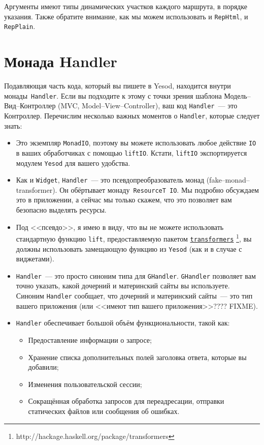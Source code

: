 Аргументы имеют типы динамических участков каждого маршрута, в порядке
указания. Также обратите внимание, как мы можем использовать и
\lstinline!RepHtml!, и \lstinline!RepPlain!.

\section{Монада Handler}
Подавляющая часть кода, который вы пишете в Yesod, находится внутри
монады~\lstinline!Handler!. Если вы подходите к этому с точки зрения
шаблона Модель--Вид--Контроллер (MVC, Model--View--Controller), ваш код
\lstinline!Handler!~--- это Контроллер. Перечислим несколько важных
моментов о \lstinline!Handler!, которые следует знать:
\begin{itemize}
\item Это экземпляр \lstinline!MonadIO!, поэтому вы можете
  использовать любое действие \lstinline!IO! в ваших обработчиках с
  помощью \lstinline!liftIO!. Кстати, \lstinline!liftIO! экспортируется
  модулем \lstinline!Yesod! для вашего удобства.
\item Как и \lstinline!Widget!, \lstinline!Handler!~--- это
  псевдопреобразователь монад (fake--monad--transformer). Он обёртывает
  монаду~\lstinline!ResourceT IO!. Мы подробно обсуждаем это в
  приложении, а
  сейчас мы только скажем, что это позволяет вам безопасно выделять
  ресурсы.
\item Под <<псевдо>>, я имею в виду, что вы не можете использовать
  стандартную функцию \lstinline!lift!, предоставляемую пакетом
  \href{http://hackage.haskell.org/package/transformers}
       {\texttt{transformers}}
  \footnote{http://hackage.haskell.org/package/transformers}, вы
  должны использовать замещающую функцию из \lstinline!Yesod! (как и в
  случае с виджетами).
\item \lstinline!Handler!~--- это просто синоним типа для
  \lstinline!GHandler!. \lstinline!GHandler! позволяет вам точно
  указать, какой дочерний и материнский сайты вы используете. Синоним
  \lstinline!Handler! сообщает, что дочерний и материнский сайты~---
  это тип вашего приложения (или <<имеют тип вашего приложения>>????
  FIXME).
\item \lstinline!Handler! обеспечивает большой объём функциональности,
  такой как:
\begin{itemize}
\item Предоставление информации о запросе;
\item Хранение списка дополнительных полей заголовка ответа, которые
  вы добавили;
\item Изменения пользовательской сессии;
\item Сокращённая обработка запросов для переадресации, отправки
  статических файлов или сообщения об ошибках.
\end{itemize}
\end{itemize}

